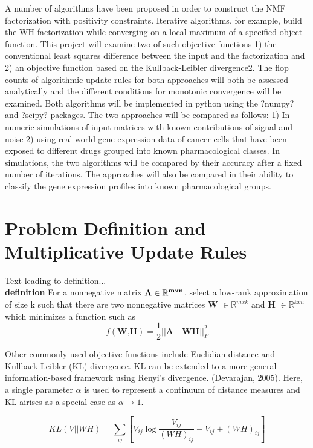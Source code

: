 \documentclass[final,leqno,onefignum,onetabnum]{siamltex1213}
\begin{document}
A number of algorithms have been proposed in order to construct the NMF factorization with positivity constraints. Iterative algorithms, for example, build the WH factorization while converging on a local maximum of a specified object function. This project will examine two of such objective functions 1) the conventional least squares difference between the input and the factorization and 2) an objective function based on the Kullback-Leibler divergence2. The flop counts of algorithmic update rules for both approaches will both be assessed analytically and the different conditions for monotonic convergence will be examined. Both algorithms will be implemented in python using the ?numpy? and ?scipy? packages. The two approaches will be compared as follows: 1) In numeric simulations of input matrices with known contributions of signal and noise 2) using real-world gene expression data of cancer cells that have been exposed to different drugs grouped into known pharmacological classes. In simulations, the two algorithms will be compared by their accuracy after a fixed number of iterations. The approaches will also be compared in their ability to classify the gene expression profiles into known pharmacological groups.

\section{Problem Definition and Multiplicative Update Rules}

Text leading to definition... \\

\textbf{definition} For a nonnegative matrix $\bf{A} \in \mathbb{R}^{m x n} $, select a low-rank approximation of size k such that there are two nonnegative matrices \textbf{W} $ \in \mathbb{R}^{m x k}$ and \textbf{H} $ \in \mathbb{R}^{k x n}$ which minimizes a function such as 
$$ f( \textbf{W,H}) = \frac{1}{2} || \textbf{A - WH} || ^{2}_{F}$$


Other commonly used objective functions include Euclidian distance and Kullback-Leibler (KL) divergence. KL can be extended to a more general information-based framework using Renyi's divergence. (Devarajan, 2005). Here, a single parameter $\alpha$ is used to represent a continuum of distance measures and KL airises as a special case as $\alpha \to 1$. 

$$ KL(V || WH) = \sum_{ij}{[V_{ij} \log{ \frac{V_{ij}}{(WH)_{ij}} - V_{ij} + (WH)_{ij}} ]} $$
\end{document}
